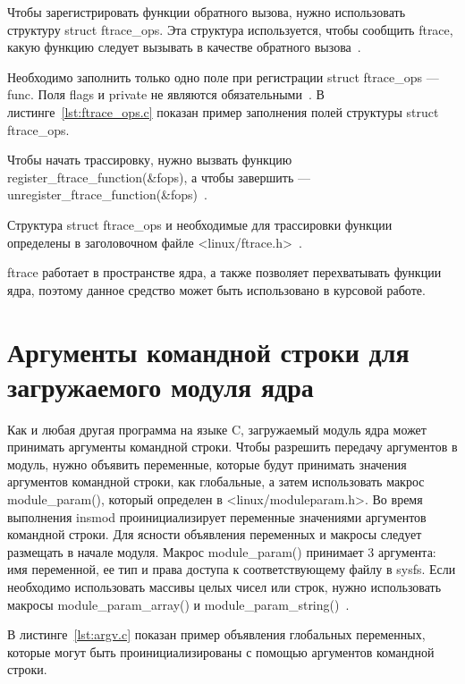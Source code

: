 \documentclass{bmstu}
\begin{document}
Чтобы зарегистрировать функции обратного вызова, нужно использовать структуру struct ftrace\_ops. 
Эта структура используется, чтобы сообщить ftrace, какую функцию следует вызывать в качестве обратного вызова~\cite{Ftrace}.

Необходимо заполнить только одно поле при регистрации struct ftrace\_ops --- func. 
Поля flags и private не являются обязательными~\cite{Ftrace}. 
В листинге~\ref{lst:ftrace_ops.c} показан пример заполнения полей структуры struct ftrace\_ops.


Чтобы начать трассировку, нужно вызвать функцию register\_ftrace\_function(\&fops), а чтобы завершить --- unregister\_ftrace\_function(\&fops)~\cite{Ftrace}.

Структура struct ftrace\_ops и необходимые для трассировки функции определены в заголовочном файле <linux/ftrace.h>~\cite{Ftrace}.

ftrace работает в пространстве ядра, а также позволяет перехватывать функции ядра, поэтому данное средство может быть использовано в курсовой работе.

\section{Аргументы командной строки для загружаемого модуля ядра}

Как и любая другая программа на языке C, загружаемый модуль ядра может принимать аргументы командной строки. 
Чтобы разрешить передачу аргументов в модуль, нужно объявить переменные, которые будут принимать значения аргументов командной строки, как глобальные, а затем использовать макрос module\_param(), который определен в <linux/moduleparam.h>. 
Во время выполнения insmod проинициализирует переменные значениями аргументов командной строки. 
Для ясности объявления переменных и макросы следует размещать в начале модуля. 
Макрос module\_param() принимает 3 аргумента: имя переменной, ее тип и права доступа к соответствующему файлу в sysfs. 
Если необходимо использовать массивы целых чисел или строк, нужно использовать макросы module\_param\_array() и module\_param\_string()~\cite{ArgvLkm}.

В листинге~\ref{lst:argv.c} показан пример объявления глобальных переменных, которые могут быть проинициализированы с помощью аргументов командной строки.

\end{document}
